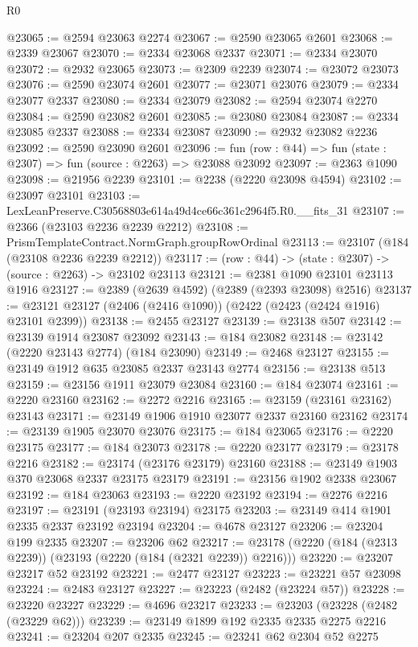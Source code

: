 \begin{lexlean}{R0}
\begin{coremodule}
@23065 := @2594 @23063 @2274
@23067 := @2590 @23065 @2601
@23068 := @2339 @23067
@23070 := @2334 @23068 @2337
@23071 := @2334 @23070
@23072 := @2932 @23065
@23073 := @2309 @2239
@23074 := @23072 @23073
@23076 := @2590 @23074 @2601
@23077 := @23071 @23076
@23079 := @2334 @23077 @2337
@23080 := @2334 @23079
@23082 := @2594 @23074 @2270
@23084 := @2590 @23082 @2601
@23085 := @23080 @23084
@23087 := @2334 @23085 @2337
@23088 := @2334 @23087
@23090 := @2932 @23082 @2236
@23092 := @2590 @23090 @2601
@23096 := fun (row : @44) => fun (state : @2307) => fun (source : @2263) => @23088 @23092
@23097 := @2363 @1090
@23098 := @21956 @2239
@23101 := @2238 (@2220 @23098 @4594)
@23102 := @23097 @23101
@23103 := LexLeanPreserve.C30568803e614a49d4ce66c361c2964f5.R0.__fits_31
@23107 := @2366 (@23103 @2236 @2239 @2212)
@23108 := PrismTemplateContract.NormGraph.groupRowOrdinal
@23113 := @23107 (@184 (@23108 @2236 @2239 @2212))
@23117 := (row : @44) -> (state : @2307) -> (source : @2263) -> @23102 @23113
@23121 := @2381 @1090 @23101 @23113 @1916
@23127 := @2389 (@2639 @4592) (@2389 (@2393 @23098) @2516)
@23137 := @23121 @23127 (@2406 (@2416 @1090)) (@2422 (@2423 (@2424 @1916) @23101 @2399))
@23138 := @2455 @23127
@23139 := @23138 @507
@23142 := @23139 @1914 @23087 @23092
@23143 := @184 @23082
@23148 := @23142 (@2220 @23143 @2774) (@184 @23090)
@23149 := @2468 @23127
@23155 := @23149 @1912 @635 @23085 @2337 @23143 @2774
@23156 := @23138 @513
@23159 := @23156 @1911 @23079 @23084
@23160 := @184 @23074
@23161 := @2220 @23160
@23162 := @2272 @2216
@23165 := @23159 (@23161 @23162) @23143
@23171 := @23149 @1906 @1910 @23077 @2337 @23160 @23162
@23174 := @23139 @1905 @23070 @23076
@23175 := @184 @23065
@23176 := @2220 @23175
@23177 := @184 @23073
@23178 := @2220 @23177
@23179 := @23178 @2216
@23182 := @23174 (@23176 @23179) @23160
@23188 := @23149 @1903 @370 @23068 @2337 @23175 @23179
@23191 := @23156 @1902 @2338 @23067
@23192 := @184 @23063
@23193 := @2220 @23192
@23194 := @2276 @2216
@23197 := @23191 (@23193 @23194) @23175
@23203 := @23149 @414 @1901 @2335 @2337 @23192 @23194
@23204 := @4678 @23127
@23206 := @23204 @199 @2335
@23207 := @23206 @62
@23217 := @23178 (@2220 (@184 (@2313 @2239)) (@23193 (@2220 (@184 (@2321 @2239)) @2216)))
@23220 := @23207 @23217 @52 @23192
@23221 := @2477 @23127
@23223 := @23221 @57 @23098
@23224 := @2483 @23127
@23227 := @23223 (@2482 (@23224 @57))
@23228 := @23220 @23227
@23229 := @4696 @23217
@23233 := @23203 (@23228 (@2482 (@23229 @62)))
@23239 := @23149 @1899 @192 @2335 @2335 @2275 @2216
@23241 := @23204 @207 @2335
@23245 := @23241 @62 @2304 @52 @2275

\end{coremodule}
\end{lexlean}
